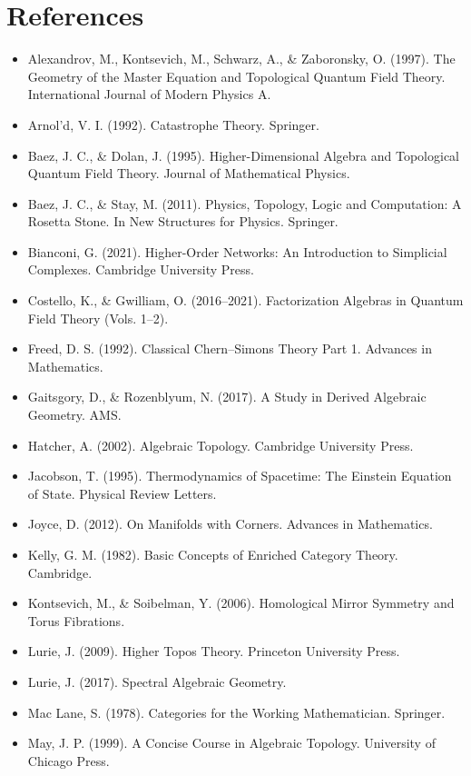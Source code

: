 \documentclass[12pt,a4paper]{article}
\theoremstyle{definition}
\theoremstyle{plain}
\begin{document}
\section*{References}
\begin{itemize}
\item Alexandrov, M., Kontsevich, M., Schwarz, A., \& Zaboronsky, O. (1997). The Geometry of the Master Equation and Topological Quantum Field Theory. International Journal of Modern Physics A.
\item Arnol'd, V. I. (1992). Catastrophe Theory. Springer.
\item Baez, J. C., \& Dolan, J. (1995). Higher-Dimensional Algebra and Topological Quantum Field Theory. Journal of Mathematical Physics.
\item Baez, J. C., \& Stay, M. (2011). Physics, Topology, Logic and Computation: A Rosetta Stone. In New Structures for Physics. Springer.
\item Bianconi, G. (2021). Higher-Order Networks: An Introduction to Simplicial Complexes. Cambridge University Press.
\item Costello, K., \& Gwilliam, O. (2016--2021). Factorization Algebras in Quantum Field Theory (Vols. 1--2).
\item Freed, D. S. (1992). Classical Chern--Simons Theory Part 1. Advances in Mathematics.
\item Gaitsgory, D., \& Rozenblyum, N. (2017). A Study in Derived Algebraic Geometry. AMS.
\item Hatcher, A. (2002). Algebraic Topology. Cambridge University Press.
\item Jacobson, T. (1995). Thermodynamics of Spacetime: The Einstein Equation of State. Physical Review Letters.
\item Joyce, D. (2012). On Manifolds with Corners. Advances in Mathematics.
\item Kelly, G. M. (1982). Basic Concepts of Enriched Category Theory. Cambridge.
\item Kontsevich, M., \& Soibelman, Y. (2006). Homological Mirror Symmetry and Torus Fibrations.
\item Lurie, J. (2009). Higher Topos Theory. Princeton University Press.
\item Lurie, J. (2017). Spectral Algebraic Geometry.
\item Mac Lane, S. (1978). Categories for the Working Mathematician. Springer.
\item May, J. P. (1999). A Concise Course in Algebraic Topology. University of Chicago Press.

\end{itemize}
\end{document}
